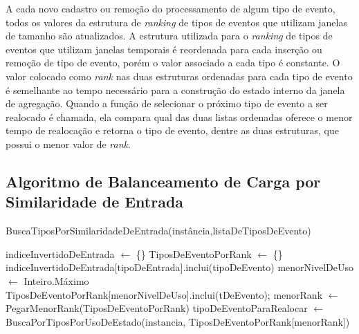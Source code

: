 A cada novo cadastro ou remoção do processamento de algum tipo de evento, todos os valores da estrutura de \textit{ranking} de tipos de eventos que utilizam janelas de tamanho são atualizados. A estrutura utilizada para o \textit{ranking} de tipos de eventos que utilizam janelas temporais é reordenada para cada inserção  ou remoção de tipo de evento, porém o valor associado a cada tipo é constante.  O valor colocado como \textit{rank} nas duas estruturas ordenadas para cada tipo de evento é semelhante ao tempo necessário para a construção do estado interno da janela de agregação. Quando a função de selecionar o próximo tipo de evento a ser realocado é chamada, ela compara qual das duas listas ordenadas oferece o menor tempo de realocação e retorna o tipo de evento, dentre as duas estruturas, que possui o menor valor de \textit{rank}.


\subsection{Algoritmo de Balanceamento de Carga por Similaridade de Entrada}
\begin{algorithm}[h!]
\caption{BuscaTiposPorSimilaridadeDeEntrada(instância,listaDeTiposDeEvento)}
\label{alg:relocation_similarity}
\begin{algorithmic}[1]
\STATE indiceInvertidoDeEntrada $\leftarrow$ \{\}   
\STATE TiposDeEventoPorRank $\leftarrow$ \{\} 
\STATE indiceInvertidoDeEntrada[tipoDeEntrada].inclui(tipoDeEvento)
\ENDFOR
\ENDFOR
{} 
\STATE menorNivelDeUso $\leftarrow$ Inteiro.Máximo
\ENDIF
\ENDFOR
\STATE TiposDeEventoPorRank[menorNivelDeUso].inclui(tDeEvento);
\ENDFOR
\STATE menorRank $\leftarrow$ PegarMenorRank(TiposDeEventoPorRank)
\RETURN tipoDeEventoParaRealocar $\leftarrow$ BuscaPorTiposPorUsoDeEstado(instancia, TiposDeEventoPorRank[menorRank])
\end{algorithmic}
\end{algorithm}


